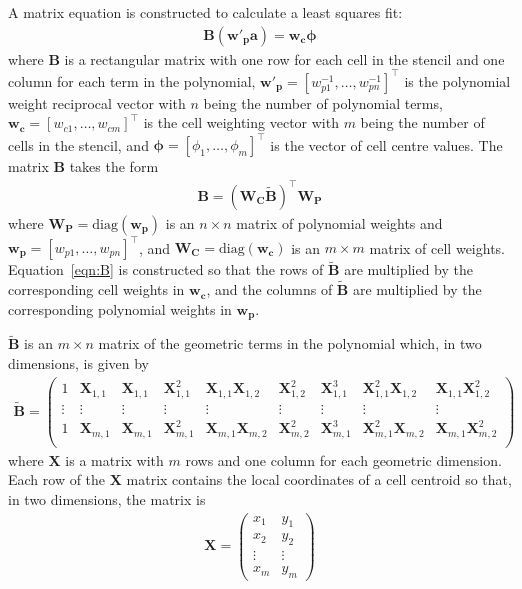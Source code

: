 \documentclass{article}
\begin{document}
A matrix equation is constructed to calculate a least squares fit:
\begin{align}
	\mathbf{B} \left(\mathbf{w'_p} \mathbf{a}\right) = \mathbf{w_c} \bm{\phi}
\end{align}
where $\mathbf{B}$ is a rectangular matrix with one row for each cell in the stencil and one column for each term in the polynomial, $\mathbf{w'_p} = [w_{p1}^{-1}, \ldots, w_{pn}^{-1}]^\intercal$ is the polynomial weight reciprocal vector with $n$ being the number of polynomial terms,  $\mathbf{w_c} = [w_{c1}, \ldots, w_{cm}]^\intercal$ is the cell weighting vector with $m$ being the number of cells in the stencil, and $\bm{\phi} = [\phi_1, \ldots, \phi_m]^\intercal$ is the vector of cell centre values.
The matrix $\mathbf{B}$ takes the form
\begin{align}
	\mathbf{B} = \left( \mathbf{W_C} \mathbf{\tilde{B}} \right)^\intercal \mathbf{W_P} \label{eqn:B}
\end{align}
where $\mathbf{W_P} = \mathrm{diag}(\mathbf{w_p})$ is an $n \times n$ matrix of polynomial weights and $\mathbf{w_p} = [w_{p1}, \ldots, w_{pn}]^\intercal$, and $\mathbf{W_C} = \mathrm{diag}(\mathbf{w_c})$ is an $m \times m$ matrix of cell weights.  Equation~\ref{eqn:B} is constructed so that the rows of $\mathbf{\tilde{B}}$ are multiplied by the corresponding cell weights in $\mathbf{w_c}$, and the columns of $\mathbf{\tilde{B}}$ are multiplied by the corresponding polynomial weights in $\mathbf{w_p}$.

$\mathbf{\tilde{B}}$ is an $m \times n$ matrix of the geometric terms in the polynomial which, in two dimensions, is given by
\begin{align}
	\mathbf{\tilde{B}} = 
	\begin{pmatrix}
		1 & \mathbf{X}_{1,1} & \mathbf{X}_{1,1} & \mathbf{X}_{1,1}^2 & \mathbf{X}_{1,1} \mathbf{X}_{1,2} & \mathbf{X}_{1,2}^2 & \mathbf{X}_{1,1}^3 & \mathbf{X}_{1,1}^2 \mathbf{X}_{1,2} & \mathbf{X}_{1,1} \mathbf{X}_{1,2}^2 \\
		\vdots & \vdots & \vdots & \vdots & \vdots & \vdots & \vdots & \vdots & \vdots \\
		1 & \mathbf{X}_{m,1} & \mathbf{X}_{m,1} & \mathbf{X}_{m,1}^2 & \mathbf{X}_{m,1} \mathbf{X}_{m,2} & \mathbf{X}_{m,2}^2 & \mathbf{X}_{m,1}^3 & \mathbf{X}_{m,1}^2 \mathbf{X}_{m,2} & \mathbf{X}_{m,1} \mathbf{X}_{m,2}^2 \\
	\end{pmatrix}
\end{align}
where $\mathbf{X}$ is a matrix with $m$ rows and one column for each geometric dimension.  
Each row of the $\mathbf{X}$ matrix contains the local coordinates of a cell centroid so that, in two dimensions, the matrix is
\begin{align}
	\mathbf{X} = 
	\begin{pmatrix}
		x_1 & y_1 \\
		x_2 & y_2 \\
		\vdots & \vdots \\
		x_m & y_m
	\end{pmatrix}
\end{align}
\end{document}
